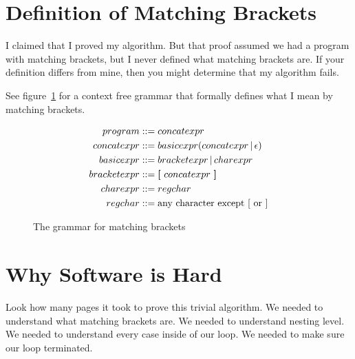 \documentclass[10pt]{amsart}
\newcommand{\defined}{\mathrel{\text{::=}}}
\begin{document}
\section*{Definition of Matching Brackets}
I claimed that I proved my algorithm. But that proof assumed we had a 
program with matching brackets, but I never defined what matching brackets
are. If your definition differs from mine, then you might determine
that my algorithm fails.

See figure~\ref{fig:grammar} for a context free grammar that formally defines
what I mean by matching brackets. 


\begin{figure}
\caption{The grammar for matching brackets}
\label{fig:grammar}
\begin{align*}
program & \defined concatexpr \\
concatexpr & \defined basicexpr (concatexpr \mathop{|} \epsilon) \\
basicexpr & \defined bracketexpr \mathop{|} charexpr \\
bracketexpr & \defined \text{{\bf[} }concatexpr\text{ {\bf]}} \\
charexpr & \defined regchar \\
regchar & \defined \text{any character except [ or ]}
\end{align*}
\end{figure}

\section{Why Software is Hard}
Look how many pages it took to prove this trivial algorithm. We needed
to understand what matching brackets are. We needed to understand nesting level.
We needed to understand every case inside of our loop. We needed to make
sure our loop terminated.
\end{document}
